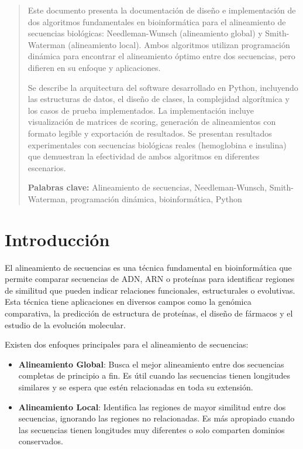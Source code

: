 \documentclass[12pt,a4paper]{article}
\begin{document}
\begin{abstract}
\noindent
Este documento presenta la documentación de diseño e implementación de dos algoritmos fundamentales en bioinformática para el alineamiento de secuencias biológicas: Needleman-Wunsch (alineamiento global) y Smith-Waterman (alineamiento local). Ambos algoritmos utilizan programación dinámica para encontrar el alineamiento óptimo entre dos secuencias, pero difieren en su enfoque y aplicaciones.

Se describe la arquitectura del software desarrollado en Python, incluyendo las estructuras de datos, el diseño de clases, la complejidad algorítmica y los casos de prueba implementados. La implementación incluye visualización de matrices de scoring, generación de alineamientos con formato legible y exportación de resultados. Se presentan resultados experimentales con secuencias biológicas reales (hemoglobina e insulina) que demuestran la efectividad de ambos algoritmos en diferentes escenarios.

\vspace{0.5cm}
\noindent\textbf{Palabras clave:} Alineamiento de secuencias, Needleman-Wunsch, Smith-Waterman, programación dinámica, bioinformática, Python

\end{abstract}


\newpage
{}
\tableofcontents

\newpage
{}

\section{Introducción}

El alineamiento de secuencias es una técnica fundamental en bioinformática que permite comparar secuencias de ADN, ARN o proteínas para identificar regiones de similitud que pueden indicar relaciones funcionales, estructurales o evolutivas. Esta técnica tiene aplicaciones en diversos campos como la genómica comparativa, la predicción de estructura de proteínas, el diseño de fármacos y el estudio de la evolución molecular.

Existen dos enfoques principales para el alineamiento de secuencias:

\begin{itemize}
    \item \textbf{Alineamiento Global}: Busca el mejor alineamiento entre dos secuencias completas de principio a fin. Es útil cuando las secuencias tienen longitudes similares y se espera que estén relacionadas en toda su extensión.
    
    \item \textbf{Alineamiento Local}: Identifica las regiones de mayor similitud entre dos secuencias, ignorando las regiones no relacionadas. Es más apropiado cuando las secuencias tienen longitudes muy diferentes o solo comparten dominios conservados.
\end{itemize}
\end{document}
